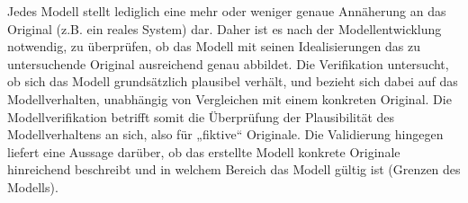 \documentclass[letterpaper,10pt,german]{jupyterBook}
\begin{document}
\sphinxAtStartPar
{}

\sphinxAtStartPar
Jedes Modell stellt lediglich eine mehr oder weniger genaue Annäherung an das Original (z.B. ein reales System) dar. Daher ist es nach der Modellentwicklung notwendig, zu überprüfen, ob das Modell mit seinen Idealisierungen das zu untersuchende Original ausreichend genau abbildet. Die Verifikation untersucht, ob sich das Modell grundsätzlich plausibel verhält, und bezieht sich dabei auf das Modellverhalten, unabhängig von Vergleichen mit einem konkreten Original. Die Modellverifikation betrifft somit die Überprüfung der Plausibilität des Modellverhaltens an sich, also für „fiktive“ Originale. Die Validierung hingegen liefert eine Aussage darüber, ob das erstellte Modell konkrete Originale hinreichend beschreibt und in welchem Bereich das Modell gültig ist (Grenzen des Modells).
\end{document}
